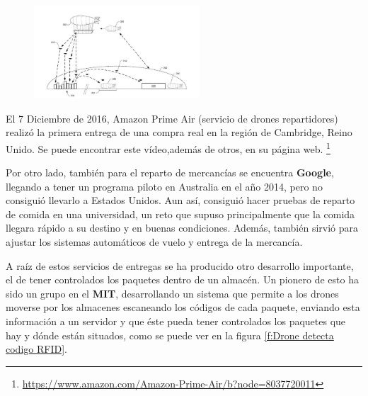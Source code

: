 \begin{figure}[ht]
	\centering
		\includegraphics[width=0.55\textwidth]{imgs/amazon.jpg}
	\label{fig:Esquema de reparto con drones}
\end{figure}

\hspace{1 cm} El 7 Diciembre de 2016, Amazon Prime Air (servicio de drones repartidores) realiz\'o la primera entrega de una compra real en la regi\'on de Cambridge, Reino Unido. Se puede encontrar este v\'ideo,adem\'as de otros, en su p\'agina web. \footnote{\url{https://www.amazon.com/Amazon-Prime-Air/b?node=8037720011}}

\hspace{1 cm} Por otro lado, tambi\'en para el reparto de mercanc\'ias se encuentra \textbf{Google}, llegando a tener un programa piloto en Australia en el año 2014, pero no consigui\'o llevarlo a Estados Unidos. Aun as\'i, consigui\'o hacer pruebas de reparto de comida en una universidad, un reto que supuso principalmente que la comida llegara r\'apido a su destino y en buenas condiciones. Adem\'as, tambi\'en sirvi\'o para ajustar los sistemas autom\'aticos de vuelo y entrega de la mercanc\'ia. 


\hspace{1 cm} A ra\'iz de estos servicios de entregas se ha producido otro desarrollo importante, el de tener controlados los paquetes dentro de un almac\'en. Un pionero de esto ha sido un grupo en el \textbf{MIT}, desarrollando un sistema que permite a los drones moverse por los almacenes escaneando los c\'odigos de cada paquete, enviando esta informaci\'on a un servidor y que \'este pueda tener controlados los paquetes que hay y d\'onde est\'an situados, como se puede ver en la figura \ref{f:Drone detecta codigo RFID}. 



